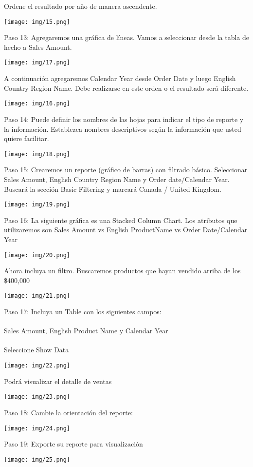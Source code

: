 \documentclass[12pt,letterpaper]{article}
\begin{document}
Ordene el resultado por año de manera ascendente.
\begin{center}
    \texttt{[image: img/15.png]}  
\end{center}
Paso 13: Agregaremos una gráfica de líneas. Vamos a seleccionar desde la tabla de hecho a Sales
Amount.
\begin{center}
    \texttt{[image: img/17.png]}  
\end{center}
A continuación agregaremos Calendar Year desde Order Date y luego English Country Region Name.
Debe realizarse en este orden o el resultado será diferente.
\begin{center}
    \texttt{[image: img/16.png]}  
\end{center}
Paso 14: Puede definir los nombres de las hojas para indicar el tipo de reporte y la información.
Establezca nombres descriptivos según la información que usted quiere facilitar.
\begin{center}
    \texttt{[image: img/18.png]}  
\end{center}
Paso 15: Crearemos un reporte (gráfico de barras) con filtrado básico. Seleccionar Sales Amount, English
Country Region Name y Order date/Calendar Year. Buscará la sección Basic Filtering y marcará Canada /
United Kingdom.
\begin{center}
    \texttt{[image: img/19.png]}  
\end{center}
Paso 16: La siguiente gráfica es una Stacked Column Chart. Los atributos que utilizaremos son Sales
Amount vs English ProductName vs Order Date/Calendar Year
\begin{center}
    \texttt{[image: img/20.png]}
    \vspace{2cm}  
\end{center}
Ahora incluya un filtro. Buscaremos productos que hayan vendido arriba de los \$400,000
\begin{center}
    \texttt{[image: img/21.png]}  
\end{center}
Paso 17: Incluya un Table con los siguientes campos:
\\\\Sales Amount, English Product Name y Calendar Year
\\\\Seleccione Show Data
\begin{center}
    \texttt{[image: img/22.png]}  
\end{center}
Podrá visualizar el detalle de ventas
\begin{center}
    \texttt{[image: img/23.png]}  
\end{center}
Paso 18: Cambie la orientación del reporte:
\begin{center}
    \texttt{[image: img/24.png]}  
\end{center}
Paso 19: Exporte su reporte para visualización
\begin{center}
    \texttt{[image: img/25.png]}  
\end{center}
\end{document}
